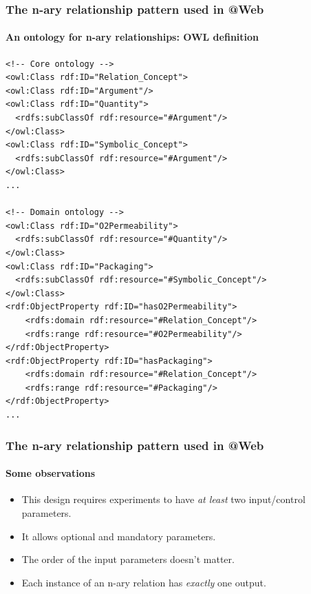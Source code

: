 \documentclass{beamer}
\makeatletter
\newcommand{\atweb}{\textbf{@Web}\xspace}
\makeatother
\begin{document}
\begin{frame}[fragile]
  \frametitle{The n-ary relationship pattern used in \atweb}
  \framesubtitle{An ontology for n-ary relationships: OWL definition}

  \begin{Verbatim}[fontsize=\tiny]
<!-- Core ontology -->
<owl:Class rdf:ID="Relation_Concept">
<owl:Class rdf:ID="Argument"/>
<owl:Class rdf:ID="Quantity">
  <rdfs:subClassOf rdf:resource="#Argument"/>
</owl:Class>
<owl:Class rdf:ID="Symbolic_Concept">
  <rdfs:subClassOf rdf:resource="#Argument"/>
</owl:Class>
...

<!-- Domain ontology -->
<owl:Class rdf:ID="O2Permeability">
  <rdfs:subClassOf rdf:resource="#Quantity"/>
</owl:Class>
<owl:Class rdf:ID="Packaging">
  <rdfs:subClassOf rdf:resource="#Symbolic_Concept"/>
</owl:Class>
<rdf:ObjectProperty rdf:ID="hasO2Permeability">
    <rdfs:domain rdf:resource="#Relation_Concept"/>
    <rdfs:range rdf:resource="#O2Permeability"/>
</rdf:ObjectProperty>
<rdf:ObjectProperty rdf:ID="hasPackaging">
    <rdfs:domain rdf:resource="#Relation_Concept"/>
    <rdfs:range rdf:resource="#Packaging"/>
</rdf:ObjectProperty>
...
  \end{Verbatim}
\end{frame}

\begin{frame}
  \frametitle{The n-ary relationship pattern used in \atweb}
  \framesubtitle{Some observations}

  \begin{itemize}
    \item This design requires experiments to have \textit{at least} two
      input/control parameters.

    \pause

    \item It allows optional and mandatory parameters.

    \pause

    \item The order of the input parameters doesn't matter.

    \pause

    \item Each instance of an n-ary relation has \textit{exactly} one output.
  \end{itemize}
\end{frame}
\end{document}
